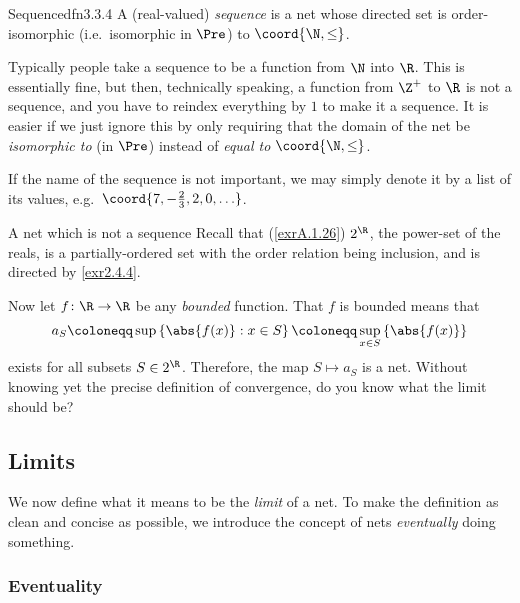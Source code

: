 \begin{dfn}{Sequence}{dfn3.3.4}
A (real-valued) \emph{sequence} is a net whose directed set is order-isomorphic (i.e.~isomorphic in $\Pre$) to $\coord{\N ,\leq}$.
\begin{rmk}
Typically people take a sequence to be a function from $\N$ into $\R$.  This is essentially fine, but then, technically speaking, a function from $\Z ^+$ to $\R$ is not a sequence, and you have to reindex everything by $1$ to make it a sequence.  It is easier if we just ignore this by only requiring that the domain of the net be \emph{isomorphic to} (in $\Pre$) instead of \emph{equal to} $\coord{\N ,\leq}$.
\end{rmk}
\begin{rmk}
If the name of the sequence is not important, we may simply denote it by a list of its values, e.g.~$\coord{7,-\tfrac{2}{3},2,0,\ldots }$.
\end{rmk}
\end{dfn}
\begin{exm}{A net which is not a sequence}{}
Recall that (\cref{exrA.1.26}) $2^{\R}$, the power-set of the reals, is a partially-ordered set with the order relation being inclusion, and is directed by \cref{exr2.4.4}.

Now let $f\colon \R \rightarrow \R$ be any \emph{bounded} function.  That $f$ is bounded means that
\begin{equation}
a_S\coloneqq \sup \left\{ \abs{f(x)}:x\in S\right\} \coloneqq \sup _{x\in S}\left\{ \abs{f(x)}\right\}
\end{equation}
exists for all subsets $S\in 2^{\R}$.  Therefore, the map $S\mapsto a_S$ is a net.  Without knowing yet the precise definition of convergence, do you know what the limit should be?
\end{exm}

\subsection{Limits}

We now define what it means to be the \emph{limit} of a net.  To make the definition as clean and concise as possible, we introduce the concept of nets \emph{eventually} doing something.

\subsubsection{Eventuality}\label{sss2.4.2.1}

